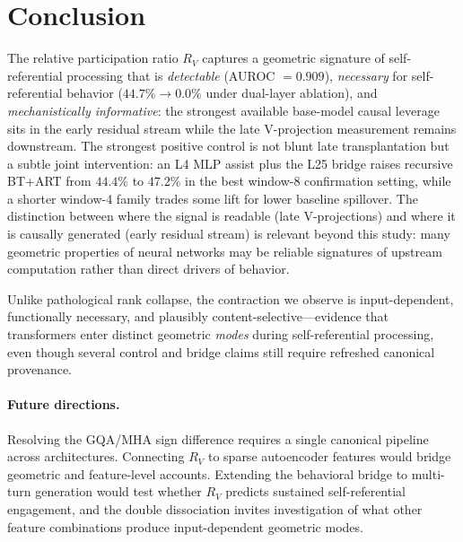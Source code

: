 \documentclass{article}
\newcommand{\RV}{R_V}
\begin{document}
\section{Conclusion}

The relative participation ratio $\RV$ captures a geometric signature of self-referential
processing that is \emph{detectable} (AUROC $= 0.909$),
\emph{necessary} for self-referential behavior ($44.7\% \to 0.0\%$ under dual-layer ablation),
and \emph{mechanistically informative}: the strongest available base-model causal leverage sits in
the early residual stream while the late V-projection measurement remains downstream.
The strongest positive control is not blunt late transplantation but a subtle joint intervention:
an L4 MLP assist plus the L25 bridge raises recursive BT+ART from $44.4\%$ to $47.2\%$ in the
best window-8 confirmation setting, while a shorter window-4 family trades some lift for lower
baseline spillover.
The distinction between where the signal is readable (late V-projections) and where it is
causally generated (early residual stream) is relevant beyond this study: many geometric
properties of neural networks may be reliable signatures of upstream computation rather than
direct drivers of behavior.

Unlike pathological rank collapse, the contraction we observe is input-dependent, functionally
necessary, and plausibly content-selective---evidence that transformers enter distinct geometric
\emph{modes} during self-referential processing, even though several control and bridge claims
still require refreshed canonical provenance.

\paragraph{Future directions.}
Resolving the GQA/MHA sign difference requires a single canonical pipeline across architectures.
Connecting $\RV$ to sparse autoencoder features would bridge geometric and feature-level
accounts.
Extending the behavioral bridge to multi-turn generation would test whether $\RV$ predicts
sustained self-referential engagement, and the double dissociation invites investigation of
what other feature combinations produce input-dependent geometric modes.




\end{document}
